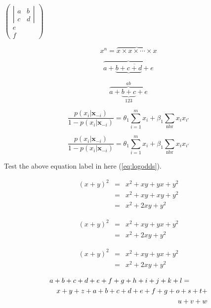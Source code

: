\documentclass[11pt]{article}
\newcommand{\sumnbr}{\sum_{\mbox{nbr}}}
\begin{document}
$\left( \begin{array}{c} 
\left| \begin{array}{cc} 
a & b \\
c & d
\end{array} \right| \\
e \\
f 
\end{array} \right) $

$$x^n = \overbrace{x\times x \times \cdots \times x}$$

$$\overbrace{a+\underbrace{b+\overline{c+d}}+e}$$

$$\overbrace{a+\underbrace{b+c}_{123}+e}^{ab}$$

\begin{equation} \label{eq:logodds}
\frac{p(x_i|\textbf{x}_{-i})}{1-p(x_i|\textbf{x}_{-i})} = \theta_1 \sum_{i=1}^m x_i + \beta_1 \sumnbr x_ix_{i'}
\end{equation} 

\begin{equation}
\frac{p(x_i|\bm{x}_{-i})}{1-p(x_i|\bm{x}_{-i})} = \theta_1 \sum_{i=1}^m x_i + \beta_1 \sumnbr x_ix_{i'}
\end{equation} 

Test the above equation label in here (\ref{eq:logodds}).

\begin{eqnarray}
(x+y)^2 & = & x^2 + xy + yx + y^2 \label{eqnarray1} \\
		& = & x^2 + xy + xy + y^2 \nonumber \\
		& = & x^2 + 2xy + y^2 \label{eqnarray2}
\end{eqnarray}

\begin{eqnarray}
(x+y)^2 & = & x^2 + xy + yx + y^2 \\
		& = & x^2 + 2xy + y^2 \nonumber
\end{eqnarray}

\begin{eqnarray*}
(x+y)^2 & = & x^2 + xy + yx + y^2 \\
		& = & x^2 + 2xy + y^2 \nonumber
\end{eqnarray*}

\begin{eqnarray*}
\lefteqn{a+b+c+d+e+f+g+h+i+j+k+l=} \\
& & x+y+z+a+b+c+d+e+f+g+o+s+t+ \\
& & u+v+w
\end{eqnarray*}
\end{document}
